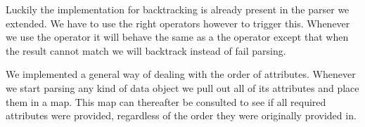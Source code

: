 \par
Luckily the implementation for backtracking is already present in the parser we
extended. We have to use the right operators however to trigger this. Whenever
we use the  operator it will behave the same as a the
\sn{\textasciicircum\textasciicircum} operator except that when the result cannot
match we will backtrack instead of fail parsing.

\par
We implemented a general way of dealing with the order of attributes. Whenever
we start parsing any kind of data object we pull out all of its attributes and
place them in a map. This map can thereafter be consulted to see if all required
attributes were provided, regardless of the order they were originally provided
in.
